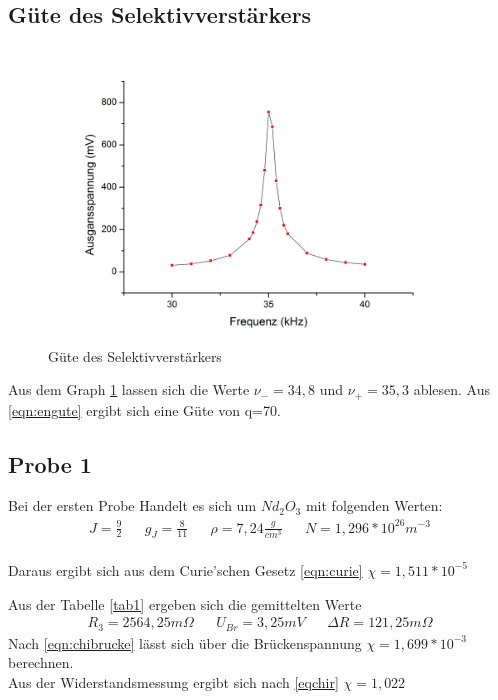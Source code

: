 \subsection{Güte des Selektivverstärkers}

\begin{figure}[h]
		\begin{center}
		\includegraphics[scale=0.4]{gute.jpg}
		\caption{Güte des Selektivverstärkers}
		\label{gute}
		\end{center}	
\end{figure}

Aus dem Graph \ref{gute} lassen sich die Werte $\nu_-=34,8$ und $\nu_+=35,3$ ablesen. Aus \eqref{eqn:engute} ergibt sich eine Güte von q=70.

\subsection{Probe 1}
Bei der ersten Probe Handelt es sich um $Nd_2O_3$ mit folgenden Werten:
\begin{align*}
&J=\frac92&
&g_J=\frac{8}{11}&
&\rho=7,24\frac{g}{cm^3}&
&N=1,296*10^{26}m^{-3}&
\end{align*}
\\
Daraus ergibt sich aus dem Curie'schen Gesetz \eqref{eqn:curie}
$\chi=1,511*10^{-5}$

Aus der Tabelle \ref{tab1} ergeben sich die gemittelten Werte
\begin{align*}
&R_3=2564,25m\Omega&
&U_{Br}=3,25mV&
&\Delta R=121,25m\Omega&
\end{align*}
Nach \eqref{eqn:chibrucke} lässt sich über die Brückenspannung
$\chi=1,699*10^{-3}$
berechnen.
\\
Aus der Widerstandsmessung ergibt sich nach \eqref{eqchir}
$\chi=1,022$


